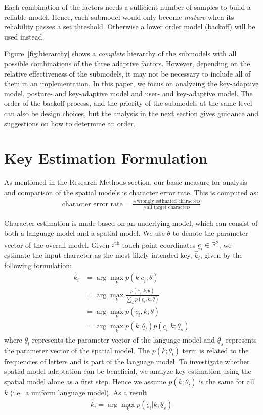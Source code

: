 \documentclass{sigchi}
\begin{document}
Each combination of the factors needs a sufficient number of samples to build a 
reliable model. Hence, each submodel would only become \textit{mature} when its reliability passes a set threshold. Otherwise a lower order model (backoff) will be used instead.

Figure~\ref{fig:hierarchy} shows a \textit{complete} hierarchy of the submodels with all
possible combinations of the three adaptive factors. However, depending on the
relative effectiveness of the submodels, it may not be necessary to include all of
them in an implementation. In this paper, we focus on analyzing the key-adaptive model, posture- and key-adaptive model and user- and key-adaptive model.
The order of the backoff process, and the priority of the submodels at the same
level can also be design choices, but the analysis in the next section gives
guidance and suggestions on how to determine an order.

\section{Key Estimation Formulation}\label{sec:formulation}
As mentioned in the Research Methods section, our basic measure for analysis and comparison of the spatial models is character error rate. This is computed as:
\begin{align}
\text{character error rate} = \frac{\text{\# wrongly estimated
characters}}{\text{\# all target characters}}
\end{align}

Character estimation is made based on an underlying model, which can consist of
both a language model and a spatial model.
We use $\underline\theta$ to denote the parameter vector of the overall model. Given
$i$\textsuperscript{th} touch point coordinates $\underline c_i \in \mathbb{R}^2$, we estimate the input character as the most likely intended key, $\hat k_i$,  given by the following formulation:
\begin{align}
\hat k_i &= \arg\max_k p(k | \underline c_i; \underline \theta) \\
          &= \arg\max_k \frac{p(\underline c_i, k; \underline \theta)}{\sum_k p(\underline c_i, k; \underline \theta)} \\
          &= \arg\max_k p(\underline c_i, k; \underline \theta) \\
          &= \arg\max_k p(k;\underline\theta_l)p(\underline c_i | k; \underline \theta_s) \label{eq:likely-k}
\end{align}
where $\underline\theta_l$ represents the parameter vector of the language model and $\underline\theta_s$ represents the parameter vector of the spatial model. The $p(k;\underline\theta_l)$ term is related to the frequencies of letters and is part of the language model. To investigate whether spatial model adaptation can be beneficial, we analyze key estimation using the spatial model alone as a first step. Hence we assume $p(k; \underline\theta_l)$ is the same for all $k$ (i.e.\ a uniform language model). As a result
\begin{align}
\hat k_i = \arg\max_k p(\underline c_i | k; \underline \theta_s)
\end{align}
\end{document}
